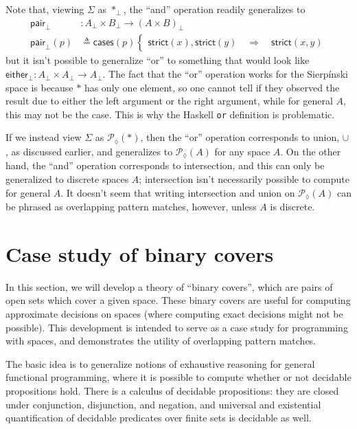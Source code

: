 \documentclass[conference]{IEEEtran}
\newcommand{\PLower}{\mathcal{P}_\lozenge}
\newcommand{\One}{\ast}
\newcommand{\Branch}{\Rightarrow}
\begin{document}
Note that, viewing $\Sigma$ as $\One_\bot$, the ``and'' operation readily generalizes to 
\begin{align*}
 \mathsf{pair}_\bot &: A_\bot \times B_\bot \to \left( A \times B \right)_\bot
\\ \mathsf{pair}_\bot(p) &\triangleq \mathsf{cases}(p)
\begin{cases}
\mathsf{strict}(x) , \mathsf{strict}(y)
  \quad \Branch \quad \mathsf{strict}(x, y)
\end{cases}
\end{align*}
but it isn't possible to generalize ``or'' to something that would look like $ \mathsf{either}_\bot: A_\bot \times A_\bot \to A_\bot$. The fact that the ``or'' operation works for the Sierp\'inski space is because $\One$ has only one element, so one cannot tell if they observed the result due to either the left argument or the right argument, while for general $A$, this may not be the case. This is why the Haskell \texttt{or} definition is problematic.

If we instead view $\Sigma$ as $\PLower(\One)$, then the ``or'' operation corresponds to union, $\cup$, as discussed earlier, and generalizes to $\PLower(A)$ for any space $A$. On the other hand, the ``and'' operation corresponds to intersection, and this can only be generalized to discrete spaces $A$; intersection isn't necessarily possible to compute for general $A$. It doesn't seem that writing intersection and union on $\PLower(A)$ can be phrased as overlapping pattern matches, however, unless $A$ is discrete.

\section{Case study of binary covers}

In this section, we will develop a theory of ``binary covers'', which are pairs of open sets which cover a given space. These binary covers are useful for computing approximate decisions on spaces (where computing exact decisions might not be possible). This development is intended to serve as a case study for programming with spaces, and demonstrates the utility of overlapping pattern matches.

The basic idea is to generalize notions of exhaustive reasoning for general functional programming, where it is possible to compute whether or not decidable propositions hold. There is a calculus of decidable propositions: they are closed under conjunction, disjunction, and negation, and universal and existential quantification of decidable predicates over finite sets is decidable as well.
\end{document}
